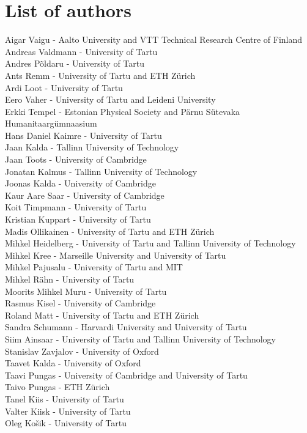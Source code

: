 \documentclass[11pt]{article}
\begin{document}
\section{List of authors}

Aigar Vaigu - Aalto University and VTT Technical Research Centre of Finland\\
Andreas Valdmann - University of Tartu\\
Andres Põldaru - University of Tartu\\
Ants Remm - University of Tartu and ETH Zürich \\
Ardi Loot - University of Tartu\\
Eero Vaher - University of Tartu and Leideni University\\
Erkki Tempel - Estonian Physical Society and Pärnu Sütevaka Humanitaargümnaasium\\
Hans Daniel Kaimre - University of Tartu\\
Jaan Kalda - Tallinn University of Technology\\
Jaan Toots - University of Cambridge\\
Jonatan Kalmus - Tallinn University of Technology\\
Joonas Kalda - University of Cambridge\\
Kaur Aare Saar - University of Cambridge\\
Koit Timpmann - University of Tartu\\
Kristian Kuppart - University of Tartu\\
Madis Ollikainen - University of Tartu and ETH Zürich \\
Mihkel Heidelberg - University of Tartu and Tallinn University of Technology\\
Mihkel Kree - Marseille University and University of Tartu\\
Mihkel Pajusalu - University of Tartu and MIT\\
Mihkel Rähn - University of Tartu\\
Moorits Mihkel Muru - University of Tartu\\
Rasmus Kisel - University of Cambridge\\
Roland Matt - University of Tartu and ETH Zürich \\
Sandra Schumann - Harvardi University and University of Tartu\\
Siim Ainsaar  - University of Tartu and Tallinn University of Technology\\
Stanislav Zavjalov - University of Oxford\\
Taavet Kalda - University of Oxford\\
Taavi Pungas - University of Cambridge and University of Tartu\\
Taivo Pungas - ETH Zürich \\
Tanel Kiis - University of Tartu\\
Valter Kiisk - University of Tartu\\
Oleg Košik - University of Tartu\\
\end{document}

